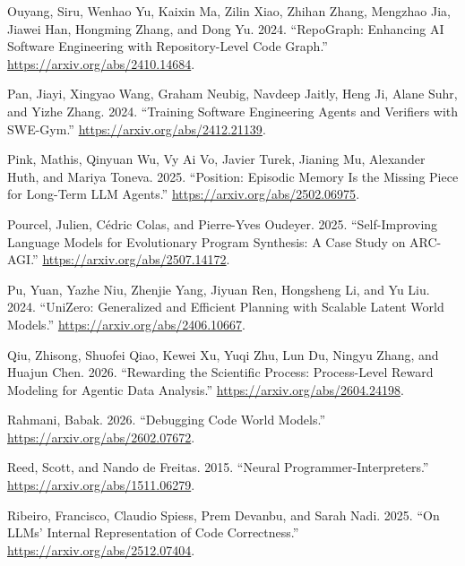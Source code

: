 \documentclass{article}
\newlength{\cslhangindent}
\newenvironment{CSLReferences}[2]
 {%
  \setlength{\parindent}{0pt}
  \everypar{\setlength{\hangindent}{\cslhangindent}}\ignorespaces
 }
 {\par}
\begin{document}
\begin{CSLReferences}{1}{0}
\leavevmode{}%
Ouyang, Siru, Wenhao Yu, Kaixin Ma, Zilin Xiao, Zhihan Zhang, Mengzhao
Jia, Jiawei Han, Hongming Zhang, and Dong Yu. 2024. {``RepoGraph:
Enhancing AI Software Engineering with Repository-Level Code Graph.''}
\url{https://arxiv.org/abs/2410.14684}.

\leavevmode{}%
Pan, Jiayi, Xingyao Wang, Graham Neubig, Navdeep Jaitly, Heng Ji, Alane
Suhr, and Yizhe Zhang. 2024. {``Training Software Engineering Agents and
Verifiers with SWE-Gym.''} \url{https://arxiv.org/abs/2412.21139}.

\leavevmode{}%
Pink, Mathis, Qinyuan Wu, Vy Ai Vo, Javier Turek, Jianing Mu, Alexander
Huth, and Mariya Toneva. 2025. {``Position: Episodic Memory Is the
Missing Piece for Long-Term LLM Agents.''}
\url{https://arxiv.org/abs/2502.06975}.

\leavevmode{}%
Pourcel, Julien, Cédric Colas, and Pierre-Yves Oudeyer. 2025.
{``Self-Improving Language Models for Evolutionary Program Synthesis: A
Case Study on ARC-AGI.''} \url{https://arxiv.org/abs/2507.14172}.

\leavevmode{}%
Pu, Yuan, Yazhe Niu, Zhenjie Yang, Jiyuan Ren, Hongsheng Li, and Yu Liu.
2024. {``UniZero: Generalized and Efficient Planning with Scalable
Latent World Models.''} \url{https://arxiv.org/abs/2406.10667}.

\leavevmode{}%
Qiu, Zhisong, Shuofei Qiao, Kewei Xu, Yuqi Zhu, Lun Du, Ningyu Zhang,
and Huajun Chen. 2026. {``Rewarding the Scientific Process:
Process-Level Reward Modeling for Agentic Data Analysis.''}
\url{https://arxiv.org/abs/2604.24198}.

\leavevmode{}%
Rahmani, Babak. 2026. {``Debugging Code World Models.''}
\url{https://arxiv.org/abs/2602.07672}.

\leavevmode{}%
Reed, Scott, and Nando de Freitas. 2015. {``Neural
Programmer-Interpreters.''} \url{https://arxiv.org/abs/1511.06279}.

\leavevmode{}%
Ribeiro, Francisco, Claudio Spiess, Prem Devanbu, and Sarah Nadi. 2025.
{``On LLMs' Internal Representation of Code Correctness.''}
\url{https://arxiv.org/abs/2512.07404}.


\end{CSLReferences}
\end{document}
